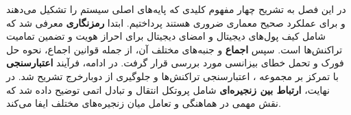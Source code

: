 در این فصل به تشریح چهار مفهوم کلیدی که پایه‌های اصلی سیستم را تشکیل می‌دهند و برای عملکرد صحیح معماری ضروری هستند پرداختیم. ابتدا \textbf{رمزنگاری} معرفی شد که شامل کیف پول‌های دیجیتال و امضای دیجیتال برای احراز هویت و تضمین تمامیت تراکنش‌ها است. سپس \textbf{اجماع} و جنبه‌های مختلف آن، از جمله قوانین اجماع، نحوه حل فورک و تحمل خطای بیزانسی مورد بررسی قرار گرفت. در ادامه، فرآیند \textbf{اعتبارسنجی} با تمرکز بر مجموعه ، اعتبارسنجی تراکنش‌ها و جلوگیری از دوبار‌خرج تشریح شد. در نهایت، \textbf{ارتباط بین زنجیره‌ای} شامل پروتکل انتقال و تبادل اتمی توضیح داده شد که نقش مهمی در هماهنگی و تعامل میان زنجیره‌های مختلف ایفا می‌کند.

